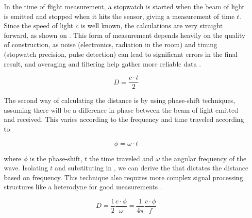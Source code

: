 In the time of flight measurement, a stopwatch is started when the beam of light is emitted and stopped when it hits the sensor, giving a measurement of time $t$. Since the speed of light $c$ is well known, the calculations are very straight forward, as shown on . This form of measurement depends heavily on the quality of construction, as noise (electronics, radiation in the room) and timing (stopwatch precision, pulse detection) can lead to significant errors in the final result, and averaging and filtering help gather more reliable data \cite{siegwart2011introduction}.

\begin{equation} \label{eq:d}
D = \frac{c \cdot t}{2}
\end{equation}

The second way of calculating the distance is by using phase-shift techniques, assuming there will be a difference in phase between the beam of light emitted and received. This varies according to the frequency and time traveled according to

\begin{equation} \label{eq:omegat}
\phi = \omega \cdot t
\end{equation}

\noindent where $\phi$ is the phase-shift, $t$ the time traveled and $\omega$ the angular frequency of the wave. Isolating $t$ and substituting in , we can derive the  that dictates the distance based on frequency. This technique also requires more complex signal processing structures like a heterodyne for good measurements \cite{siegwart2011introduction}.

\begin{equation} \label{eq:d2}
D = \frac{1}{2} \frac{c \cdot \phi}{\omega} = \frac{1}{4 \pi} \frac{c \cdot \phi}{f}
\end{equation}



